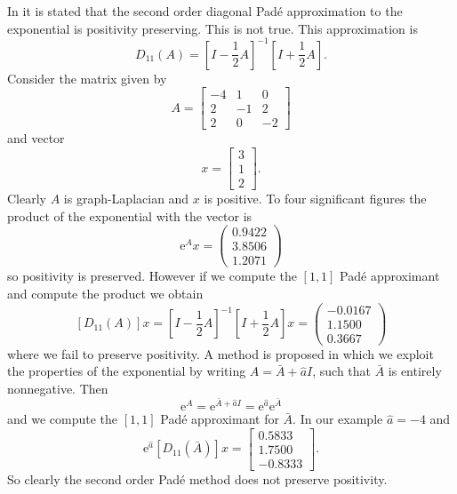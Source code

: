 In \cite{blanes_pos_2022} it is stated that the second order diagonal Pad\'e approximation to the exponential is positivity preserving.
This is not true.
This approximation is
\begin{equation*}
    D_{11}(A) = \left[ I - \frac{1}{2}A \right]^{-1} \left[ I + \frac{1}{2} A\right].
\end{equation*}
Consider the matrix given by
\begin{equation*}
    A = \begin{bmatrix}
        -4 & 1 & 0 \\
        2 & -1 & 2 \\
        2 & 0 & -2
    \end{bmatrix}
\end{equation*}
and vector
\begin{equation*}
    x = \begin{bmatrix}
        3 \\
        1 \\
        2
    \end{bmatrix}.
\end{equation*}
Clearly $A$ is graph-Laplacian and $x$ is positive.
To four significant figures the product of the exponential with the vector is
\begin{equation}
    \mathrm{e}^{A} x = \begin{pmatrix}
        0.9422 \\
        3.8506 \\
        1.2071
    \end{pmatrix}
\end{equation}
so positivity is preserved. However if we compute the $[1,1]$ Pad\'e approximant and compute the product we obtain
\begin{equation*}
    \left[D_{11}(A)\right]x = \left[ I - \frac{1}{2}A \right]^{-1} \left[ I + \frac{1}{2}A \right] x = \begin{pmatrix}
        -0.0167 \\
        1.1500 \\
        0.3667
    \end{pmatrix}
\end{equation*}
where we fail to preserve positivity.
A method is proposed in which we exploit the properties of the exponential by writing $A = \bar{A} + \hat{a}I$, such that $\bar{A}$ is entirely nonnegative.
Then
\begin{equation*}
    \mathrm{e}^A = \mathrm{e}^{\bar{A} + \hat{a}I} = \mathrm{e}^{\hat{a}} \mathrm{e}^{\bar{A}}
\end{equation*}
and we compute the $[1,1]$ Pad\'e approximant for $\bar{A}$.
In our example $\hat{a} = -4$ and
\begin{equation*}
    \mathrm{e}^{\hat{a}} [D_{11}(\bar{A})] x = \begin{bmatrix}
        0.5833 \\
        1.7500 \\
       -0.8333
    \end{bmatrix}.
\end{equation*}
So clearly the second order Pad\'e method does not preserve positivity.

